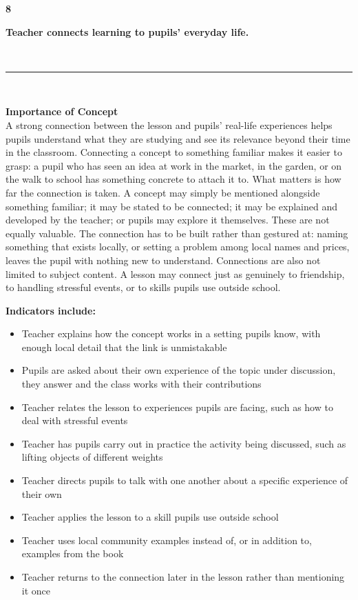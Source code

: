 \documentclass[10pt,a4paper]{article}
\newcommand{\conceptheader}[2]{%
  \noindent
  \begin{minipage}[c]{13mm}\raggedright
    {\fontsize{30}{30}\selectfont\bfseries\color{tnavy}#1}
  \end{minipage}%
  \begin{minipage}[c]{\dimexpr\linewidth-13mm\relax}\RaggedRight
    {\large\bfseries #2}
  \end{minipage}\\[1.5mm]
  \textcolor{tnavy}{\rule{\linewidth}{1.1pt}}\\[2mm]}
\newcommand{\twopane}[2]{%
  \noindent
  \begin{minipage}[t]{0.475\linewidth}\RaggedRight
    {\bfseries\small Importance of Concept}\\[1.4mm]
    \footnotesize #1 \normalsize
  \end{minipage}\hfill
  \begin{minipage}[t]{0.475\linewidth}\RaggedRight
    {\bfseries\small Indicators include:}\\[0.6mm]
    #2
  \end{minipage}\\[2mm]}
\begin{document}

\clearpage


\conceptheader{8}{Teacher connects learning to pupils' everyday life.}
\twopane{A strong connection between the lesson and pupils' real-life experiences helps pupils understand what they are studying and see its relevance beyond their time in the classroom. Connecting a concept to something familiar makes it easier to grasp: a pupil who has seen an idea at work in the market, in the garden, or on the walk to school has something concrete to attach it to. What matters is how far the connection is taken. A concept may simply be mentioned alongside something familiar; it may be stated to be connected; it may be explained and developed by the teacher; or pupils may explore it themselves. These are not equally valuable. The connection has to be built rather than gestured at: naming something that exists locally, or setting a problem among local names and prices, leaves the pupil with nothing new to understand. Connections are also not limited to subject content. A lesson may connect just as genuinely to friendship, to handling stressful events, or to skills pupils use outside school.}{\footnotesize\begin{itemize}
  \item Teacher explains how the concept works in a setting pupils know, with enough local detail that the link is unmistakable
  \item Pupils are asked about their own experience of the topic under discussion, they answer and the class works with their contributions
  \item Teacher relates the lesson to experiences pupils are facing, such as how to deal with stressful events
  \item Teacher has pupils carry out in practice the activity being discussed, such as lifting objects of different weights
  \item Teacher directs pupils to talk with one another about a specific experience of their own
  \item Teacher applies the lesson to a skill pupils use outside school
  \item Teacher uses local community examples instead of, or in addition to, examples from the book
  \item Teacher returns to the connection later in the lesson rather than mentioning it once
  
\end{itemize}\normalsize}
\end{document}
